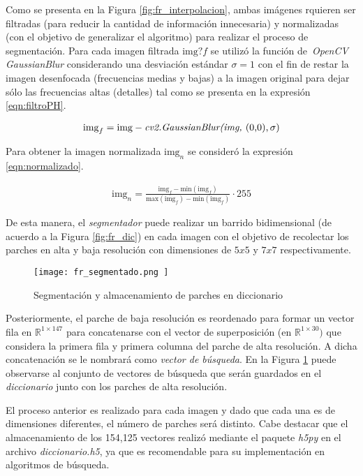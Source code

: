 Como se presenta en la Figura \ref{fig:fr_interpolacion}, ambas imágenes 
rquieren ser filtradas (para reducir la cantidad de información innecesaria)
y normalizadas (con el objetivo de generalizar el algoritmo) para realizar el
proceso de segmentación. Para cada imagen filtrada $\text{img}?f$ se utilizó la función de\
\emph{OpenCV} \emph{GaussianBlur} considerando una desviación estándar $\sigma = 1$
con el fin de restar la imagen desenfocada (frecuencias medias y bajas) a la imagen 
original para dejar sólo las frecuencias altas (detalles) tal como se presenta
en la expresión \eqref{eqn:filtroPH}.

\begin{align}
    \label{eqn:filtroPH}
    \text{img}_f = \text{img} - \text{\emph{cv2.GaussianBlur(img, }(0,0),}\, \sigma)
\end{align}

Para obtener la imagen normalizada $\text{img}_n$ se consideró la expresión \eqref{eqn:normalizado}.

\begin{align}
    \label{eqn:normalizado}
    \text{img}_n = \frac{\text{img}_f-\text{min}(\text{img}_f)}{\text{max}(\text{img}_f)-\text{min}(\text{img}_f)}\cdot 255
\end{align}

De esta manera, el \emph{segmentador} puede realizar un barrido bidimensional (de acuerdo a 
la Figura \ref{fig:fr_dic}) en cada imagen 
con el objetivo de recolectar los parches en alta y baja resolución con 
dimensiones de $5x5$ y $7x7$ respectivamente.

\begin{figure}[H]
    \texttt{[image:  fr\_segmentado.png ]}
    \centering
    \caption{ Segmentación y almacenamiento de parches en diccionario }
    \label{fig:fr_segmentador}
\end{figure}

Posteriormente, el parche de baja resolución es reordenado para formar un 
vector fila en $\mathbb{R}^{1\times147}$ para concatenarse con el vector de superposición
(en $\mathbb{R}^{1\times30})$ que considera la primera fila y primera columna del
parche de alta resolución. A dicha concatenación se le nombrará como 
\emph{vector de búsqueda}. En la Figura \ref{fig:fr_segmentador} puede observarse
al conjunto de vectores de búsqueda que serán guardados en el \emph{diccionario}
junto con los parches de alta resolución. 

El proceso anterior es realizado para cada imagen y dado que cada una es de 
dimensiones diferentes, el número de parches será distinto. Cabe 
destacar que el almacenamiento de los 154,125 vectores realizó
mediante el paquete \emph{h5py} en el archivo \emph{diccionario.h5},
ya que es recomendable para su implementación en algoritmos de búsqueda. 

